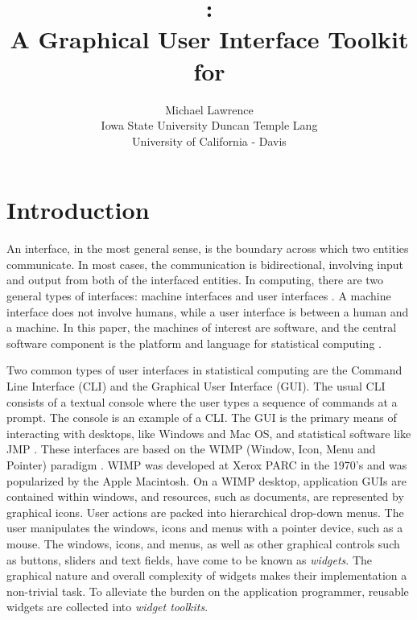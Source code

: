 \documentclass[article]{jss}
\author{Michael Lawrence\\
Iowa State University \And Duncan Temple Lang\\
University of California - Davis}
\title{\pkg{RGtk2}:\\A Graphical User Interface Toolkit for
\proglang{R}}
\begin{document}
\section{Introduction}


An interface, in the most general sense, is the boundary across which
two
entities communicate. In most cases, the communication is
bidirectional, 
involving input and output from both of the interfaced entities. In
computing,
there are two general types of interfaces: machine interfaces and user
interfaces
\citep{gui-cli}. A machine interface does not involve humans, while a 
user interface is between a human and a machine. In this paper, the
machines of
interest are software, and the central software component is the
platform and language for statistical computing \citep{R}.

Two common types of user interfaces in statistical computing are the
Command
Line Interface (CLI) and the Graphical User Interface (GUI). The usual
CLI 
consists of a textual console where the user types a sequence of
commands
at a prompt. The  console is an example of a CLI. The GUI
is the primary
means of interacting with desktops, like Windows and Mac OS, and
statistical software like JMP \citep{JMP}. These
interfaces are based on the WIMP (Window, Icon, Menu and Pointer)
paradigm 
\citep{WIMP}. WIMP was developed at Xerox PARC in the 1970's and was
popularized by 
the Apple Macintosh. On a WIMP desktop, application GUIs are contained
within 
windows, and resources, such as documents, are represented by
graphical icons. 
User actions are packed into hierarchical drop-down menus. The user
manipulates
the windows, icons and menus with a pointer device, such as a mouse.
The windows,
icons, and menus, as well as other graphical controls such as buttons,
sliders and 
text fields, have come to be known as \emph{widgets}. The graphical
nature and 
overall complexity of widgets makes their implementation a non-trivial
task.  
To alleviate the burden on the application
programmer, reusable widgets are collected into \emph{widget
toolkits}.
\end{document}
